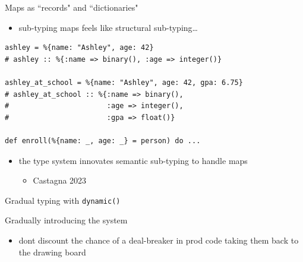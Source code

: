 \documentclass[
  ignorenonframetext,
  aspectratio=169]{beamer}
\newcommand{\passthrough}[1]{#1}
\providecommand{\tightlist}{%
  \setlength{\itemsep}{0pt}\setlength{\parskip}{0pt}}
\begin{document}
\begin{frame}[fragile]{Maps as ``records" and ``dictionaries"}
\label{maps-as-records-and-dictionaries-2}
\begin{itemize}
\tightlist
\item
  sub-typing maps feels like structural sub-typing\ldots{}
\end{itemize}

\begin{lstlisting}
ashley = %{name: "Ashley", age: 42}
# ashley :: %{:name => binary(), :age => integer()}

ashley_at_school = %{name: "Ashley", age: 42, gpa: 6.75}
# ashley_at_school :: %{:name => binary(),
#                       :age => integer(),
#                       :gpa => float()}

def enroll(%{name: _, age: _} = person) do ...
\end{lstlisting}

\begin{itemize}
\tightlist
\item
  the type system innovates semantic sub-typing to handle maps

  \begin{itemize}
  \tightlist
  \item
    Castagna 2023
  \end{itemize}
\end{itemize}
\end{frame}

\begin{frame}{Gradual typing with \passthrough{\lstinline!dynamic()!}}
\label{gradual-typing-with-dynamic}
\end{frame}

\begin{frame}{Gradually introducing the system}
\label{gradually-introducing-the-system}
\begin{itemize}
\tightlist
\item
  don\textquotesingle t discount the chance of a deal-breaker in prod
  code taking them back to the drawing board
\end{itemize}
\end{frame}
\end{document}
